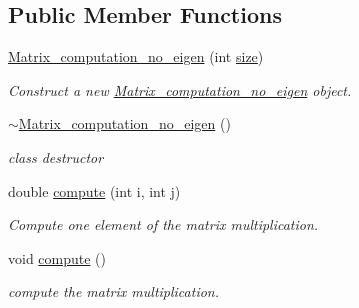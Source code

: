 \subsection*{Public Member Functions}
\begin{DoxyCompactItemize}
\item 
\hyperlink{classMatrix__computation__no__eigen_af70d9fcfdc0c9a9b755a9261211dce8a}{Matrix\+\_\+computation\+\_\+no\+\_\+eigen} (int \hyperlink{classMatrix__computation__no__eigen_a1f73cf9e7670c6a78a64cb8977f2dcc6}{size})
\begin{DoxyCompactList}\small\item\em Construct a new \hyperlink{classMatrix__computation__no__eigen}{Matrix\+\_\+computation\+\_\+no\+\_\+eigen} object. \end{DoxyCompactList}\item 
\hyperlink{classMatrix__computation__no__eigen_a47f33ea53cf14f1c6b86218203c8af26}{$\sim$\+Matrix\+\_\+computation\+\_\+no\+\_\+eigen} ()\hypertarget{classMatrix__computation__no__eigen_a47f33ea53cf14f1c6b86218203c8af26}{}\label{classMatrix__computation__no__eigen_a47f33ea53cf14f1c6b86218203c8af26}

\begin{DoxyCompactList}\small\item\em class destructor \end{DoxyCompactList}\item 
double \hyperlink{classMatrix__computation__no__eigen_a588b833136c503e9726d7276f358f117}{compute} (int i, int j)
\begin{DoxyCompactList}\small\item\em Compute one element of the matrix multiplication. \end{DoxyCompactList}\item 
void \hyperlink{classMatrix__computation__no__eigen_a7fbc5e6986b2f630e8356e4d276aa03e}{compute} ()
\begin{DoxyCompactList}\small\item\em compute the matrix multiplication. \end{DoxyCompactList}\end{DoxyCompactItemize}
